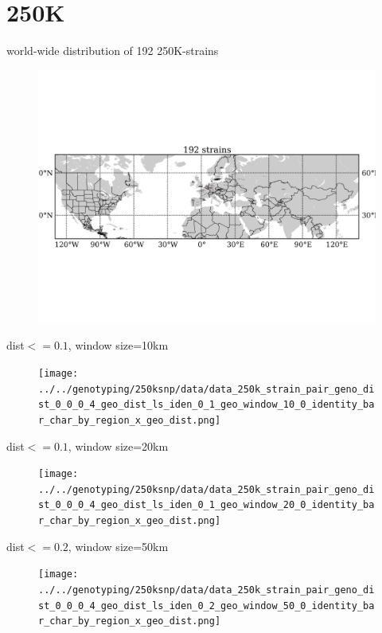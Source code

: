 \documentclass{beamer}
\begin{document}
\section{250K}


\begin{frame}{world-wide distribution of 192 250K-strains}
\begin{figure}
  \includegraphics[height=1.0\textheight, width=1.0\textwidth]{figures/suzi_192.png}
\end{figure}
\end{frame}

\begin{frame}{dist$<=0.1$, window size=10km}
\begin{figure}
  \texttt{[image: ../../genotyping/250ksnp/data/data\_250k\_strain\_pair\_geno\_dist\_0\_0\_0\_4\_geo\_dist\_ls\_iden\_0\_1\_geo\_window\_10\_0\_identity\_bar\_char\_by\_region\_x\_geo\_dist.png]}
\end{figure}
\end{frame}

\begin{frame}{dist$<=0.1$, window size=20km}
\begin{figure}
  \texttt{[image: ../../genotyping/250ksnp/data/data\_250k\_strain\_pair\_geno\_dist\_0\_0\_0\_4\_geo\_dist\_ls\_iden\_0\_1\_geo\_window\_20\_0\_identity\_bar\_char\_by\_region\_x\_geo\_dist.png]}
\end{figure}
\end{frame}

\begin{frame}{dist$<=0.2$, window size=50km}
\begin{figure}
  \texttt{[image: ../../genotyping/250ksnp/data/data\_250k\_strain\_pair\_geno\_dist\_0\_0\_0\_4\_geo\_dist\_ls\_iden\_0\_2\_geo\_window\_50\_0\_identity\_bar\_char\_by\_region\_x\_geo\_dist.png]}
\end{figure}
\end{frame}
\end{document}
